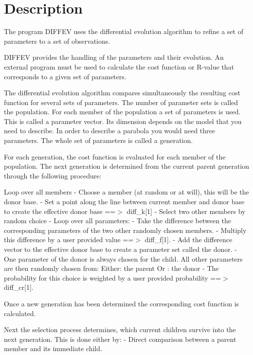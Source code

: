 \section{Description}
\par
The program DIFFEV uses the differential evolution algorithm to refine 
a set of parameters to a set of observations. 
\par
DIFFEV provides the handling of the parameters and their evolution. 
An external program must be used to calculate the cost function or 
R-value that corresponds to a given set of parameters. 
\par
The differential evolution algorithm compares simultaneously the resulting 
cost function for several sets of parameters. The number of parameter sets 
is called the population. For each member of the population a set of 
parameters is used. This is called a parameter vector. Its dimension 
depends on the model that you need to describe. In order to describe 
a parabola you would need three parameters. The whole set of parameters 
is called a generation. 
\par
For each generation, the cost function is evaluated for each member of 
the population. The next generation is determined from the current 
parent generation through the following procedure: 
\par
Loop over all members 
  - Choose a member (at random or at will), this will be the 
    donor base. 
  - Set a point along the line between current member and donor base 
    to create the effective donor base ==$> $ diff\_k[1] 
  - Select two other members by random choice 
  - Loop over all parameters: 
     - Take the difference between the corresponding parameters of the 
       two other randomly chosen members. 
     - Multiply this difference by a user provided value ==$> $ diff\_f[1]. 
     - Add the difference vector to the effective donor base to 
       create a parameter set called the donor. 
       - One parameter of the donor is always chosen for the child. 
         All other parameters are then randomly chosen from: 
         Either:  the parent 
         Or    :  the donor 
       - The probability for this choice is weighted by a user provided 
         probability ==$> $ diff\_cr[1]. 
\par
Once a new generation has been determined the corresponding cost function 
is calculated. 
\par
Next the selection process determines, which current children survive 
into the next generation. This is done either by: 
- Direct comparison between a parent member and its immediate child. 
